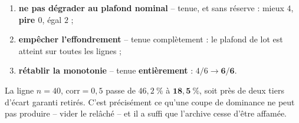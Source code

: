\documentclass[11pt,a4paper]{article}
\theoremstyle{plain}
\theoremstyle{remark}
\begin{document}
\begin{enumerate}
\item \textbf{ne pas dégrader au plafond nominal} -- tenue, et sans
  réserve : mieux $4$, \textbf{pire $0$}, égal $2$ ;
\item \textbf{empêcher l'effondrement} -- tenue complètement : le plafond de
  lot est atteint sur toutes les lignes ;
\item \textbf{rétablir la monotonie} -- tenue \textbf{entièrement} :
  $4/6\to\mathbf{6/6}$.
\end{enumerate}

La ligne $n=40$, $\text{corr}=0{,}5$ passe de $46{,}2\ \%$ à
$\mathbf{18{,}5\ \%}$, soit près de deux tiers d'écart garanti retirés.
C'est précisément
ce qu'une coupe de dominance ne peut pas produire -- vider le relâché -- et
il a suffi que l'archive cesse d'être affamée.
\end{document}
